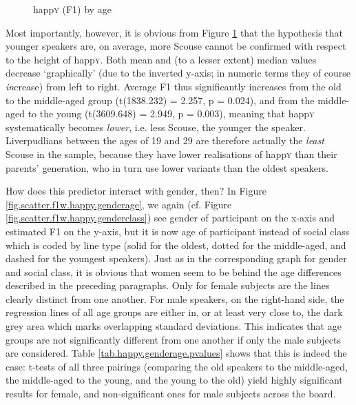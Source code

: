 \begin{figure}[h!]
	\centering
		\resizebox{0.5\linewidth}{!}{} 
	\caption{happ\textsc{y} (F1) by age}
	\label{fig.box.f1w.happy.tot}
\end{figure}

Most importantly, however, it is obvious from Figure \ref{fig.box.f1w.happy.tot} that the hypothesis that younger speakers are, on average, more Scouse cannot be confirmed with respect to the height of happ\textsc{y}.
Both mean and (to a lesser extent) median values decrease `graphically' (due to the inverted y-axis; in numeric terms they of course \emph{in}crease) from left to right.
Average F1 thus significantly increases from the old to the middle-aged group (t(1838.232) = 2.257, p = 0.024), and from the middle-aged to the young (t(3609.648) = 2.949, p = 0.003), meaning that happ\textsc{y} systematically becomes \emph{lower}, i.e. less Scouse, the younger the speaker.
Liverpudlians between the ages of 19 and 29 are therefore actually the \emph{least} Scouse in the sample, because they have lower realisations of happ\textsc{y} than their parents' generation, who in turn use lower variants than the oldest speakers.

How does this predictor interact with gender, then?
In Figure \ref{fig.scatter.f1w.happy.genderage}, we again (cf. Figure \ref{fig.scatter.f1w.happy.genderclass}) see gender of participant on the x-axis and estimated F1 on the y-axis, but it is now age of participant instead of social class which is coded by line type (solid for the oldest, dotted for the middle-aged, and dashed for the youngest speakers).
Just as in the corresponding graph for gender and social class, it is obvious that women seem to be behind the age differences described in the preceding paragraphs.
Only for female subjects are the lines clearly distinct from one another.
For male speakers, on the right-hand side, the regression lines of all age groups are either in, or at least very close to, the dark grey area which marks overlapping standard deviations.
This indicates that age groups are not significantly different from one another if only the male subjects are considered.
Table \ref{tab.happy.genderage.pvalues} shows that this is indeed the case: t-tests of all three pairings (comparing the old speakers to the middle-aged, the middle-aged to the young, and the young to the old) yield highly significant results for female, and non-significant ones for male subjects across the board.

